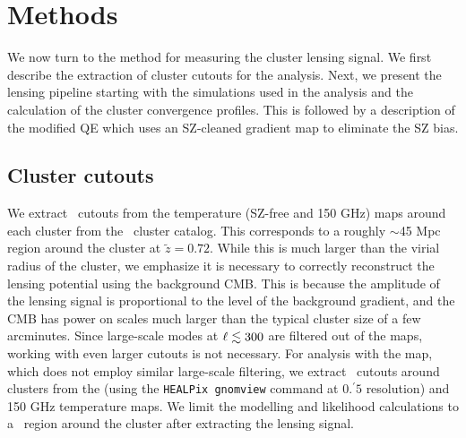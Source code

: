 \documentclass[usenatbib, twocolumn, nofootinbib, reprint]{aastex61}
\begin{document}
\section{Methods}

We now turn to the method for measuring the cluster lensing signal. We first describe the extraction of cluster cutouts for the analysis. 
Next, we present the lensing pipeline starting with the simulations used in the analysis and the calculation of the cluster convergence profiles.
This is followed by a description of the modified QE which uses an SZ-cleaned gradient map to %
eliminate the SZ bias. 

\subsection{Cluster cutouts}

We extract \boxsize\ cutouts from the \sptpol{} temperature (SZ-free and 150 GHz) maps around each cluster from the \desrm\ cluster catalog. 
This corresponds to a roughly $\sim$45 Mpc region around the cluster at $\tilde{z} = 0.72$.
While this is much larger than the virial radius of the cluster, we emphasize it is necessary to correctly reconstruct the lensing potential using the background CMB.
This is because the amplitude of the lensing signal is proportional to the level of the background gradient, and the CMB has power on scales much larger than the typical cluster size of a few arcminutes.
Since large-scale modes at $\ell \lesssim 300$ are filtered out of the \sptpol{} maps, working with even larger cutouts is not necessary.
For analysis with the \lgmca{} map, which does not employ similar large-scale filtering, we extract \boxsizelgmca\ cutouts around clusters from the \lgmca{} (using the \texttt{HEALPix gnomview} command at $0.^{\prime}5$ resolution) and \sptpol{} 150 GHz temperature maps.
We limit the modelling and likelihood calculations to a \MLboxsize\ region around the cluster after extracting the lensing signal.
\end{document}
